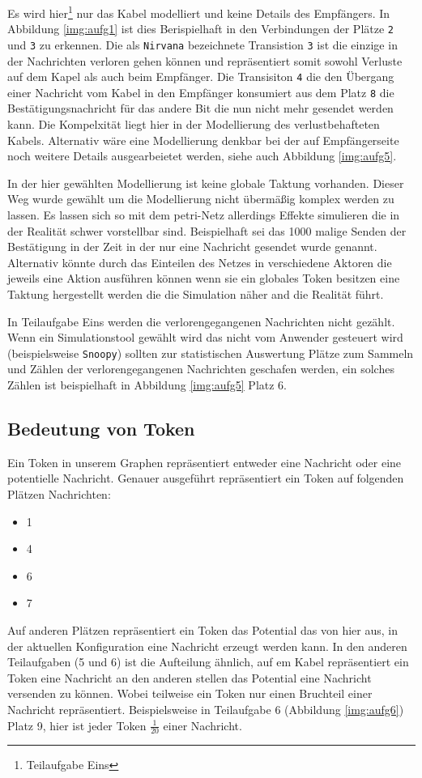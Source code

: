 \documentclass[10pt]{scrartcl}
\begin{document}
Es wird hier\footnote{Teilaufgabe Eins} nur das Kabel modelliert und keine Details des Empfängers. In Abbildung \ref{img:aufg1} ist dies Berispielhaft in den Verbindungen der Plätze \verb!2! und \verb!3! zu erkennen. Die als \verb!Nirvana! bezeichnete Transistion \verb!3! ist die einzige in der Nachrichten verloren gehen können und repräsentiert somit sowohl Verluste auf dem Kapel als auch beim Empfänger. Die Transisiton \verb!4! die den Übergang einer Nachricht vom Kabel in den Empfänger konsumiert aus dem Platz \verb!8! die Bestätigungsnachricht für das andere Bit die nun nicht mehr gesendet werden kann.
Die Kompelxität liegt hier in der Modellierung des verlustbehafteten Kabels. Alternativ wäre eine Modellierung denkbar bei der auf Empfängerseite noch weitere Details ausgearbeietet werden, siehe auch Abbildung \ref{img:aufg5}.

In der hier gewählten Modellierung ist keine globale Taktung vorhanden. Dieser Weg wurde gewählt um die Modellierung nicht übermäßig komplex werden zu lassen. Es lassen sich so mit dem petri-Netz allerdings Effekte simulieren die in der Realität schwer vorstellbar sind. Beispielhaft sei das 1000 malige Senden der Bestätigung in der Zeit in der nur eine Nachricht gesendet wurde genannt.   
Alternativ könnte durch das Einteilen des Netzes in verschiedene Aktoren die jeweils eine Aktion ausführen können wenn sie ein globales Token besitzen eine Taktung hergestellt werden die die Simulation näher and die Realität führt. 

In Teilaufgabe Eins werden die verlorengegangenen Nachrichten nicht gezählt. Wenn ein Simulationstool gewählt wird das nicht vom Anwender gesteuert wird (beispielsweise \verb!Snoopy!) sollten zur statistischen Auswertung Plätze zum Sammeln und Zählen der verlorengegangenen Nachrichten geschafen werden, ein solches Zählen ist beispielhaft in Abbildung \ref{img:aufg5} Platz 6. 

\subsection{Bedeutung von Token}
Ein Token in unserem Graphen repräsentiert entweder eine Nachricht oder eine potentielle Nachricht.
Genauer ausgeführt repräsentiert ein Token auf folgenden Plätzen Nachrichten:
\begin{itemize}
	\item 1
	\item 4
	\item 6
	\item 7
\end{itemize}
Auf anderen Plätzen repräsentiert ein Token das Potential das von hier aus, in der aktuellen Konfiguration eine Nachricht erzeugt werden kann. 
In den anderen Teilaufgaben (5 und 6) ist die Aufteilung ähnlich, auf em Kabel repräsentiert ein Token eine Nachricht an den anderen stellen das Potential eine Nachricht versenden zu können. Wobei teilweise ein Token nur einen Bruchteil einer Nachricht repräsentiert. Beispielsweise  in Teilaufgabe 6 (Abbildung \ref{img:aufg6}) Platz 9, hier ist jeder Token $\frac{1}{20}$ einer Nachricht.	
	
\end{document}
